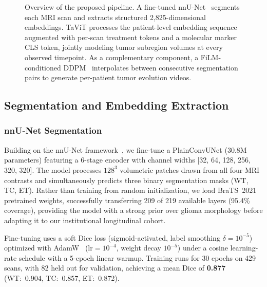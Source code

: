 \documentclass[conference]{IEEEtran}
\begin{document}
\begin{figure}[!t]
\caption{Overview of the proposed pipeline. A fine-tuned nnU-Net~\cite{isensee2021nnunet} segments each MRI scan and extracts structured 2,825-dimensional embeddings. TaViT processes the patient-level embedding sequence augmented with per-scan treatment tokens and a molecular marker CLS token, jointly modeling tumor subregion volumes at every observed timepoint. As a complementary component, a FiLM-conditioned DDPM~\cite{ho2020ddpm} interpolates between consecutive segmentation pairs to generate per-patient tumor evolution videos.}
\label{fig:pipeline}
\end{figure}



\subsection{Segmentation and Embedding Extraction}

\subsubsection{nnU-Net Segmentation}
Building on the nnU-Net framework~\cite{isensee2021nnunet}, we fine-tune a PlainConvUNet (30.8M parameters) featuring a 6-stage encoder with channel widths [32, 64, 128, 256, 320, 320]. The model processes $128^3$ volumetric patches drawn from all four MRI contrasts and simultaneously predicts three binary segmentation masks (WT, TC, ET). Rather than training from random initialization, we load BraTS~2021~\cite{baid2021brats} pretrained weights, successfully transferring 209 of 219 available layers (95.4\% coverage), providing the model with a strong prior over glioma morphology before adapting it to our institutional longitudinal cohort.

Fine-tuning uses a soft Dice loss (sigmoid-activated, label smoothing $\delta = 10^{-5}$) optimized with AdamW~\cite{loshchilov2019adamw} ($\mathrm{lr} = 10^{-4}$, weight decay $10^{-5}$) under a cosine learning-rate schedule with a 5-epoch linear warmup. Training runs for 30 epochs on 429 scans, with 82 held out for validation, achieving a mean Dice of \textbf{0.877} (WT:~0.904, TC:~0.857, ET:~0.872).
\end{document}
